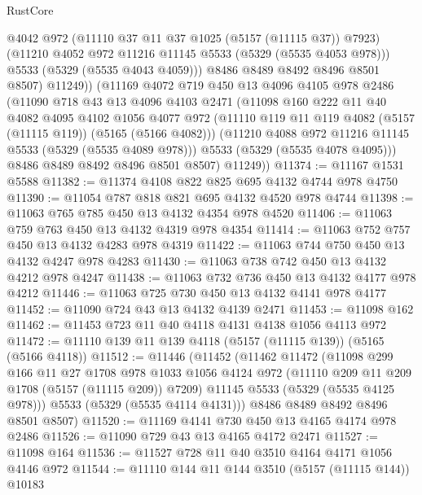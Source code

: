 \begin{lexlean}{RustCore}
\begin{coremodule}
              @4042
              @972
              (@11110 @37 @11 @37 @1025 (@5157 (@11115 @37)) @7923)
              (@11210 @4052 @972 @11216 @11145 @5533 (@5329 (@5535 @4053 @978)))
              @5533
              (@5329 (@5535 @4043 @4059)))
            @8486
            @8489
            @8492
            @8496
            @8501
            @8507)
          @11249))
      (@11169
        @4072
        @719
        @450
        @13
        @4096
        @4105
        @978
        @2486
        (@11090
          @718
          @43
          @13
          @4096
          @4103
          @2471
          (@11098
            @160
            @222
            @11
            @40
            @4082
            @4095
            @4102
            @1056
            @4077
            @972
            (@11110 @119 @11 @119 @4082 (@5157 (@11115 @119)) (@5165 (@5166 @4082)))
            (@11210 @4088 @972 @11216 @11145 @5533 (@5329 (@5535 @4089 @978)))
            @5533
            (@5329 (@5535 @4078 @4095)))
          @8486
          @8489
          @8492
          @8496
          @8501
          @8507)
        @11249))
@11374 := @11167 @1531 @5588
@11382 := @11374 @4108 @822 @825 @695 @4132 @4744 @978 @4750
@11390 := @11054 @787 @818 @821 @695 @4132 @4520 @978 @4744
@11398 := @11063 @765 @785 @450 @13 @4132 @4354 @978 @4520
@11406 := @11063 @759 @763 @450 @13 @4132 @4319 @978 @4354
@11414 := @11063 @752 @757 @450 @13 @4132 @4283 @978 @4319
@11422 := @11063 @744 @750 @450 @13 @4132 @4247 @978 @4283
@11430 := @11063 @738 @742 @450 @13 @4132 @4212 @978 @4247
@11438 := @11063 @732 @736 @450 @13 @4132 @4177 @978 @4212
@11446 := @11063 @725 @730 @450 @13 @4132 @4141 @978 @4177
@11452 := @11090 @724 @43 @13 @4132 @4139 @2471
@11453 := @11098 @162
@11462 := @11453 @723 @11 @40 @4118 @4131 @4138 @1056 @4113 @972
@11472 := @11110 @139 @11 @139 @4118 (@5157 (@11115 @139)) (@5165 (@5166 @4118))
@11512 := @11446
    (@11452
      (@11462
        @11472
        (@11098
          @299
          @166
          @11
          @27
          @1708
          @978
          @1033
          @1056
          @4124
          @972
          (@11110 @209 @11 @209 @1708 (@5157 (@11115 @209)) @7209)
          @11145
          @5533
          (@5329 (@5535 @4125 @978)))
        @5533
        (@5329 (@5535 @4114 @4131)))
      @8486
      @8489
      @8492
      @8496
      @8501
      @8507)
@11520 := @11169 @4141 @730 @450 @13 @4165 @4174 @978 @2486
@11526 := @11090 @729 @43 @13 @4165 @4172 @2471
@11527 := @11098 @164
@11536 := @11527 @728 @11 @40 @3510 @4164 @4171 @1056 @4146 @972
@11544 := @11110 @144 @11 @144 @3510 (@5157 (@11115 @144)) @10183

\end{coremodule}
\end{lexlean}
